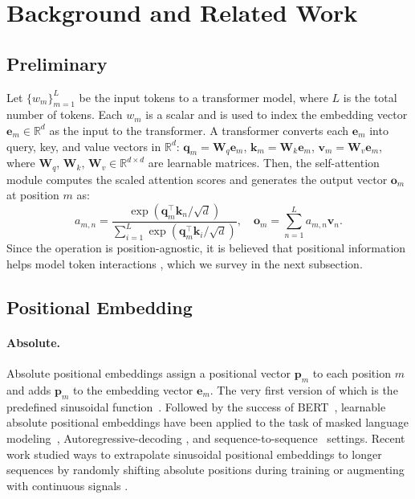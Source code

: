 \section{Background and Related Work}
\subsection{Preliminary}
Let $\{w_m\}_{m=1}^L$ be the input tokens to a transformer model, where $L$ is the total number of tokens. Each $w_m$ is a scalar and is used to index the embedding vector $\bm e_m \in\mathbb{R}^d$ as the input to the transformer. A transformer converts each $\bm e_m$ into query, key, and value vectors in $\mathbb{R}^d$: $\bm q_m=\bm W_q\bm e_m$, $\bm k_m=\bm W_k \bm e_m$, $\bm v_m=\bm W_v \bm e_m$, where $\bm W_q$, $\bm W_k$, $\bm W_v\in\mathbb{R}^{d\times d}$ are learnable matrices. Then, the self-attention module computes the scaled attention scores and generates the output vector $\bm o_m$ at position $m$ as: $$a_{m,n}=\frac{\exp(\bm q_m^\top \bm k_n/\sqrt{d})}{\sum_{i=1}^L \exp(\bm q_m^\top \bm k_i/\sqrt{d})},\quad \bm o_m = \sum_{n=1}^L a_{m,n}\bm v_n.$$
Since the operation is position-agnostic, it is believed that positional information helps model token interactions \citep{vaswani2017attention}, which we survey in the next subsection.

\subsection{Positional Embedding}
\paragraph{Absolute.} Absolute positional embeddings assign a positional vector $\bm p_m$ to each position $m$ and adds $\bm p_m$ to the embedding vector $\bm e_m$. The very first version of which is the predefined sinusoidal function~\citep{vaswani2017attention}. Followed by the success of BERT~\citep{devlin2018bert}, learnable absolute positional embeddings have been applied to the task of masked language modeling~\citep{devlin2018bert,liu2019roberta,Clark2020ELECTRA,Lan2020albert}, Autoregressive-decoding \citep{radford2018improving,radford2019language}, and sequence-to-sequence~\citep{Gehring2017seq2seq,lewis2019bart} settings. Recent work studied ways to extrapolate sinusoidal positional embeddings to longer sequences by randomly shifting absolute positions during training \citep{kiyono2021shiftedAbs} or augmenting with continuous signals \citep{Likhomanenko2021CAPE}.

